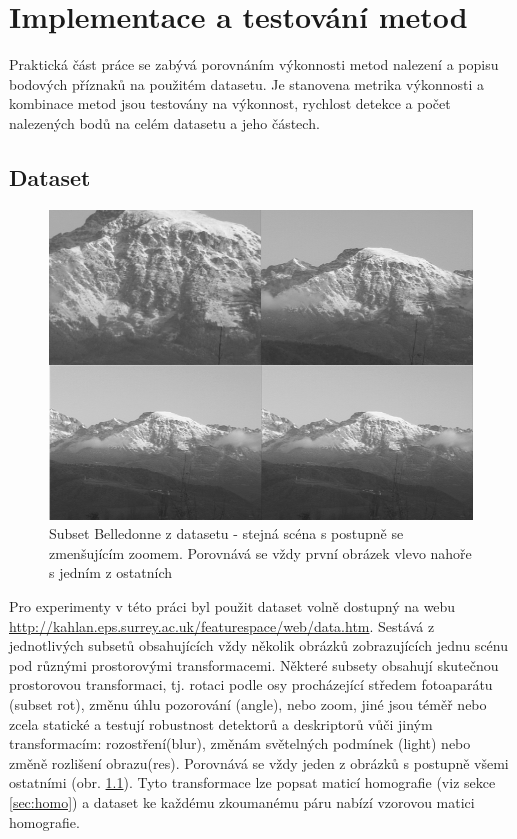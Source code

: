
\chapter{Implementace a testování metod}
\label{chap:impl}

Praktická část práce se zabývá porovnáním výkonnosti metod nalezení a popisu bodových příznaků na použitém datasetu. Je stanovena metrika výkonnosti a kombinace metod jsou testovány na výkonnost, rychlost detekce a počet nalezených bodů na celém datasetu a jeho částech.

\section{Dataset}

\begin{figure}[!ht] 
	\centering
	\includegraphics[width=5in]{img/belledonne.png}
	\caption{Subset Belledonne z datasetu - stejná scéna s postupně se zmenšujícím zoomem. Porovnává se vždy první obrázek vlevo nahoře s jedním z ostatních } 	\label{dataset_belledonne}
\end{figure}

Pro experimenty v této práci byl použit dataset volně dostupný na webu \url{http://kahlan.eps.surrey.ac.uk/featurespace/web/data.htm}. Sestává z jednotlivých subsetů obsahujících vždy několik obrázků zobrazujících jednu scénu pod různými prostorovými transformacemi. Některé subsety obsahují skutečnou prostorovou transformaci, tj. rotaci podle osy procházející středem fotoaparátu (subset rot), změnu úhlu pozorování (angle), nebo zoom, jiné jsou téměř nebo zcela statické a testují robustnost detektorů a deskriptorů vůči jiným transformacím: rozostření(blur), změnám světelných podmínek (light) nebo změně rozlišení obrazu(res). Porovnává se vždy jeden z obrázků s postupně všemi ostatními (obr. \ref{dataset_belledonne}). Tyto transformace lze popsat maticí homografie (viz sekce \ref{sec:homo}) a dataset ke každému zkoumanému páru nabízí vzorovou matici homografie.

